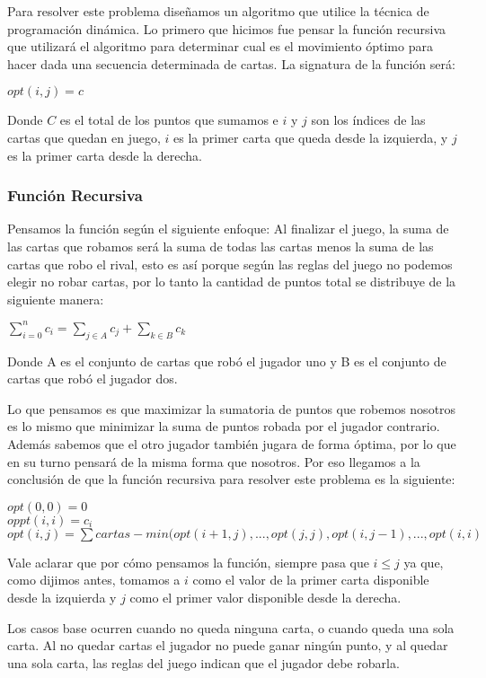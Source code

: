 Para resolver este problema diseñamos un algoritmo que utilice la técnica de programación dinámica. Lo primero que hicimos fue pensar la función recursiva que utilizará el algoritmo para determinar cual es el movimiento óptimo para hacer dada una secuencia determinada de cartas. La signatura de la función será:

$opt(i,j) = c$

Donde $C$ es el total de los puntos que sumamos e $i$ y $j$ son los índices de las cartas que quedan en juego, $i$ es la primer carta que queda desde la izquierda, y $j$ es la primer carta desde la derecha.

\subsubsection{Función Recursiva}

Pensamos la función según el siguiente enfoque: Al finalizar el juego, la suma de las cartas que robamos será la suma de todas las cartas menos la suma de las cartas que robo el rival, esto es así porque según las reglas del juego no podemos elegir no robar cartas, por lo tanto la cantidad de puntos total se distribuye de la siguiente manera:

$\sum_{i=0}^{n} c_i = \sum_{j \in A} c_j + \sum_{k \in B} c_k$

Donde A es el conjunto de cartas que robó el jugador uno y B es el conjunto de cartas que robó el jugador dos.

Lo que pensamos es que maximizar la sumatoria de puntos que robemos nosotros es lo mismo que minimizar la suma de puntos robada por el jugador contrario. Además sabemos que el otro jugador también jugara de forma óptima, por lo que en su turno pensará de la misma forma que nosotros. Por eso llegamos a la conclusión de que la función recursiva para resolver este problema es la siguiente:

$opt(0,0) = 0$ \\
$oppt(i,i) = c_i$ \\
$opt(i,j) = \sum cartas - min(opt(i+1, j), ..., opt(j,j), opt(i, j-1), ... ,opt(i,i)$

Vale aclarar que por cómo pensamos la función, siempre pasa que $i \leq j$ ya que, como dijimos antes, tomamos a $i$ como el valor de la primer carta disponible desde la izquierda y $j$ como el primer valor disponible desde la derecha.

Los casos base ocurren cuando no queda ninguna carta, o cuando queda una sola carta. Al no quedar cartas el jugador no puede ganar ningún punto, y al quedar una sola carta, las reglas del juego indican que el jugador debe robarla.

